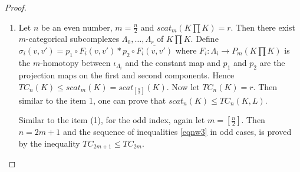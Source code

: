 \documentclass[10pt,a4paper]{amsart}
\begin{document}
\begin{proof}
\begin{enumerate}
\item
Let $n$ be an even number, $m = \frac{n}{2}$ and   $scat_m(K \prod K) = r$. Then there exist $m$-categorical subcomplexes $\Lambda_0, \ldots, \Lambda_r$ of $K \prod K$. Define $\sigma_i (v,v')= p_1 \circ F_i (v, v') * p_2 \circ \overline{F_i (v,v')}$ where $F_i: \Lambda_i \to P_m( K \prod K)$ is the $m$-homotopy between $\iota_{\Lambda_i}$ and the constant map         and $p_1$ and $p_2$ are the projection maps on the first and second components.  
Hence $TC_{n} (K) \le scat_m(K) = scat_{[\frac{n}{2}]} (K)$. 
Now let $TC_{n} (K) =r$. Then similar to the item 1, one can prove that $scat_{n} (K) \le TC_{n} (K,L)$.

Similar to the item (1), for the odd index, again let $m = [\frac{n}{2}]$. Then $n = 2m +1$ and  the sequence of inequalities \eqref{eqnw3} in odd cases, is proved by the inequality  $TC_{2m +1} \le TC_{2m}$.




 
\end{enumerate}
\end{proof}
\end{document}
